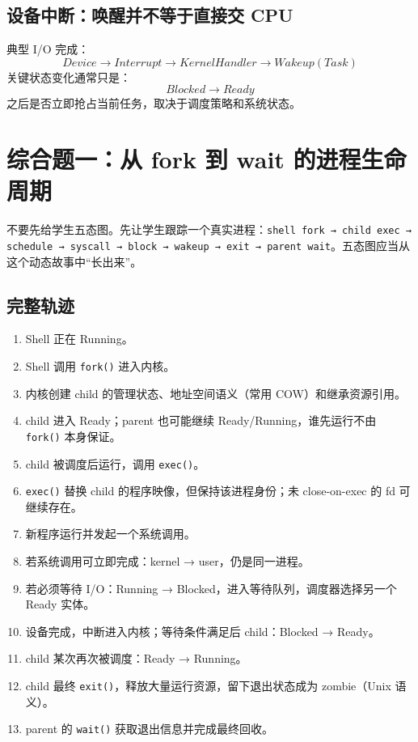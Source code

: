 \documentclass[11pt,a4paper]{ctexart}
\newcommand{\code}[1]{\texttt{#1}}
\begin{document}
\subsection{设备中断：唤醒并不等于直接交 CPU}

典型 I/O 完成：
\[
Device\rightarrow Interrupt\rightarrow KernelHandler\rightarrow Wakeup(Task)
\]
关键状态变化通常只是：
\[
Blocked\rightarrow Ready
\]
之后是否立即抢占当前任务，取决于调度策略和系统状态。

\section{综合题一：从 fork 到 wait 的进程生命周期}

\begin{corebox}[推荐课堂主线]
不要先给学生五态图。先让学生跟踪一个真实进程：\code{shell fork → child exec → schedule → syscall → block → wakeup → exit → parent wait}。五态图应当从这个动态故事中“长出来”。
\end{corebox}

\subsection{完整轨迹}

\begin{enumerate}
\item Shell 正在 Running。
\item Shell 调用 \code{fork()} 进入内核。
\item 内核创建 child 的管理状态、地址空间语义（常用 COW）和继承资源引用。
\item child 进入 Ready；parent 也可能继续 Ready/Running，谁先运行不由 \code{fork()} 本身保证。
\item child 被调度后运行，调用 \code{exec()}。
\item \code{exec()} 替换 child 的程序映像，但保持该进程身份；未 close-on-exec 的 fd 可继续存在。
\item 新程序运行并发起一个系统调用。
\item 若系统调用可立即完成：kernel → user，仍是同一进程。
\item 若必须等待 I/O：Running → Blocked，进入等待队列，调度器选择另一个 Ready 实体。
\item 设备完成，中断进入内核；等待条件满足后 child：Blocked → Ready。
\item child 某次再次被调度：Ready → Running。
\item child 最终 \code{exit()}，释放大量运行资源，留下退出状态成为 zombie（Unix 语义）。
\item parent 的 \code{wait()} 获取退出信息并完成最终回收。
\end{enumerate}
\end{document}

